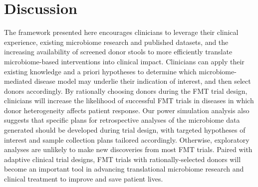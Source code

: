 \section{Discussion}

The framework presented here encourages clinicians to leverage their clinical experience, existing microbiome research and published datasets, and the increasing availability of screened donor stools to more efficiently translate microbiome-based interventions into clinical impact.
Clinicians can apply their existing knowledge and a priori hypotheses to determine which microbiome-mediated disease model may underlie their indication of interest, and then select donors accordingly.
By rationally choosing donors during the FMT trial design, clinicians will increase the likelihood of successful FMT trials in diseases in which donor heterogeneity affects patient response.
Our power simulation analysis also suggests that specific plans for retrospective analyses of the microbiome data generated should be developed during trial design, with targeted hypotheses of interest and sample collection plans tailored accordingly.
Otherwise, exploratory analyses are unlikely to make new discoveries from most FMT trials. Paired with adaptive clinical trial designs, FMT trials with rationally-selected donors will become an important tool in advancing translational microbiome research and clinical treatment to improve and save patient lives.


